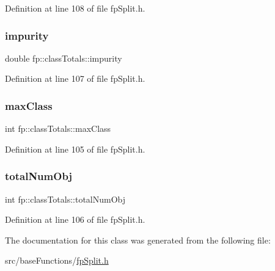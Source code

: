 Definition at line 108 of file fp\+Split.\+h.

\mbox{\label{classfp_1_1classTotals_acd239321a9b15e93e6de272c70b301b3}} 
\subsubsection{\texorpdfstring{impurity}{impurity}}
{\footnotesize\ttfamily double fp\+::class\+Totals\+::impurity\hspace{0.3cm}{\ttfamily [protected]}}



Definition at line 107 of file fp\+Split.\+h.

\mbox{\label{classfp_1_1classTotals_a83aa8e17bf3b31db3ae19b9ab554624b}} 
\subsubsection{\texorpdfstring{max\+Class}{maxClass}}
{\footnotesize\ttfamily int fp\+::class\+Totals\+::max\+Class\hspace{0.3cm}{\ttfamily [protected]}}



Definition at line 105 of file fp\+Split.\+h.

\mbox{\label{classfp_1_1classTotals_a97be63e3e4a1b7c553df839034828aae}} 
\subsubsection{\texorpdfstring{total\+Num\+Obj}{totalNumObj}}
{\footnotesize\ttfamily int fp\+::class\+Totals\+::total\+Num\+Obj\hspace{0.3cm}{\ttfamily [protected]}}



Definition at line 106 of file fp\+Split.\+h.



The documentation for this class was generated from the following file\+:\begin{DoxyCompactItemize}
\item 
src/base\+Functions/\hyperlink{fpSplit_8h}{fp\+Split.\+h}\end{DoxyCompactItemize}
